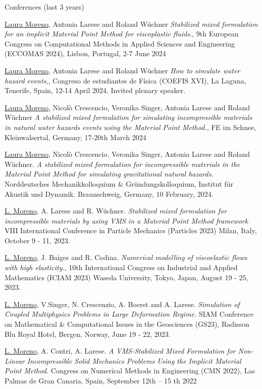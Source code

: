 \documentclass[letterpaper,english]{article}
\begin{document}
\begin{cv}{}
\begin{cvlist}{Conferences (last 3 years)}
\item[\footnotesize{JUNE 2024}] \underline{Laura Moreno}, Antonia Larese and Roland Wüchner \textit{Stabilized mixed formulation for an implicit Material Point Method for viscoplastic fluids.}, 9th European Congress on Computational Methods in Applied Sciences and Engineering (ECCOMAS 2024), Lisbon, Portugal, 2-7 June 2024

\item[\footnotesize{APR 2024}]  \underline{Laura Moreno}, Antonia Larese and Roland Wüchner \textit{How to simulate water hazard events,}, Congreso de estudiantes de Física (COEFIS XVI), La Laguna, Tenerife, Spain, 12-14 April 2024. Invited plenary speaker.
    \item[\footnotesize{MAR 2024}] \underline{Laura Moreno}, Nicolò Crescencio, Veronika Singer, Antonia Larese and Roland Wüchner \textit{A stabilized mixed formulation for simulating incompressible materials in natural water hazards events using the Material Point Method.}, FE im Schnee, Kleinwalsertal, Germany, 17-20th March 2024
    \item[\footnotesize{FEB 2024}]  \underline{Laura Moreno}, Nicolò Crescencio, Veronika Singer, Antonia Larese and Roland Wüchner. \textit{A stabilized mixed formulation for incompressible materials in the
Material Point Method for simulating gravitational natural
hazards}. Norddeutsches Mechanikkolloquium \& Gründungskolloquium, Institut für Akustik und Dynamik. Braunschweig, Germany, 10 February, 2024.
    \item[\footnotesize{OCT 2023}]  \underline{L. Moreno}, A. Larese and R. Wüchner. \textit{Stabilized mixed formulation for incompressible materials by using VMS in a Material Point Method framework} VIII International Conference in Particle Mechanics (Particles 2023) Milan, Italy, October 9 - 11, 2023.
    \item[\footnotesize{AUG 2023}]  \underline{L. Moreno}, J. Baiges and R. Codina. \textit{ Numerical modelling of viscoelastic flows with high elasticity.}, 10th International Congress on Industrial and Applied Mathematics (ICIAM 2023) 
    Waseda University, Tokyo, Japan, August 19 - 25, 2023.
    \item[\footnotesize{JUNE 2023}]  \underline{L. Moreno}, V.Singer, N. Crescenzio, A. Boerst and A. Larese. \textit{Simulation of Coupled Multiphysics Problems in Large Deformation Regime.}
     SIAM Conference on Mathematical \& Computational Issues in the Geosciences (GS23),  Radisson Blu Royal Hotel, Bergen, Norway, June 19 - 22, 2023.
    \item[\footnotesize{SEP 2022}] \underline{L. Moreno}, A. Contri, A. Larese. \textit{A VMS-Stabilized Mixed Formulation for Non-Linear Incompressible Solid Mechanics Problems Using the Implicit Material Point Method.} Congress on Numerical Methods in Engineering (CMN 2022), Las Palmas de Gran Canaria, Spain, September 12th – 15 th 2022

\end{cvlist}
\end{cv}
\end{document}
